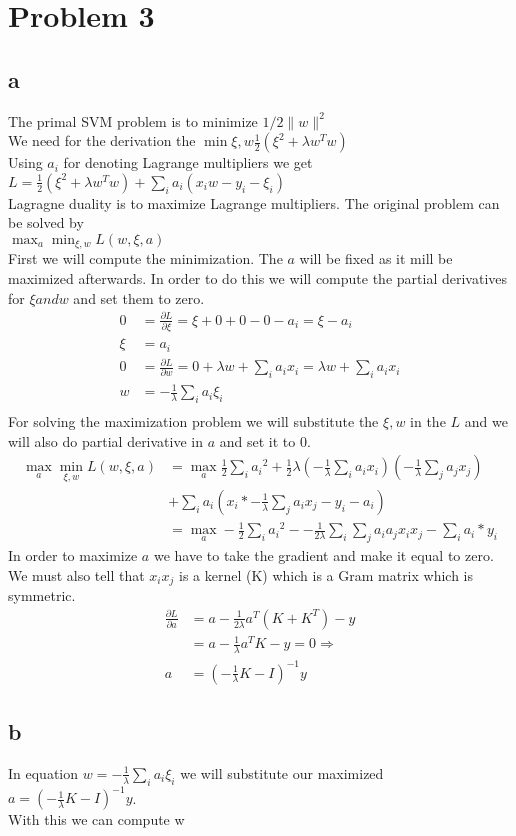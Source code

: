 \section{Problem 3}
\subsection{a}
The primal SVM problem is to minimize $1/2 \lVert{w}\rVert^2$\\
We need for the derivation the $\min\limits{\xi,w}\frac{1}{2} (\xi^2 + \lambda w^Tw)$ \\
Using $a_i$ for denoting Lagrange multipliers we get
$L = \frac{1}{2} (\xi^2 + \lambda w^Tw) + \sum_{i}{}a_i(x_iw -y_i-\xi_i)$\\
Lagragne duality is to maximize Lagrange multipliers. The original problem can be solved by \\
$\max_a\min_{\xi,w}L(w,\xi,a)$\\
First we will compute the minimization. The $a$ will be fixed as it mill be maximized afterwards.
In order to do this we will compute the partial derivatives for $\xi and w$ and set them to zero.
\begin{align*}
0 &= \frac{\partial L}{\partial \xi} = \xi + 0 + 0 - 0 - a_i = \xi - a_i\\
\xi &= a_i\\
0 &= \frac{\partial L}{\partial w} = 0 + \lambda w + \sum_{i}{}a_ix_i = \lambda w + \sum_{i}{}a_ix_i\\
w &= -\frac{1}{\lambda} \sum_{i}{}a_i\xi_i\\
\end{align*}
For solving the maximization problem we will substitute the $\xi,w$ in the $L$ and we will also do partial derivative in $a$
and set it to 0.\\
\begin{align*}
\max_a\min_{\xi,w}L(w,\xi,a) &= \max_a \frac{1}{2}\sum_i{a_i}^2 + \frac{1}{2}\lambda(-\frac{1}{\lambda}\sum_{i}{}a_ix_i) (-\frac{1}{\lambda}\sum_{j}{}a_jx_j) \\
&+ \sum_{i}{}a_i(x_i* -\frac{1}{\lambda}\sum_{j}{}a_ix_j-y_i-a_i)\\
&= \max_a-\frac{1}{2}\sum_i{a_i}^2 - -\frac{1}{2\lambda}\sum_i\sum_j a_i a_j x_i x_j - \sum_i a_i*y_i
\end{align*}
In order to maximize $a$ we have to take the gradient and make it equal to zero.
We must also tell that $x_i x_j$ is a kernel (K) which is a Gram matrix which is symmetric.
\begin{align*}
\frac{\partial L}{\partial a} &= a -\frac{1}{2\lambda}a^T(K+K^T) -y\\
&= a -\frac{1}{\lambda}a^T K -y = 0 \Rightarrow \\
a &= (-\frac{1}{\lambda}K-I)^{-1} y 
\end{align*}
\subsection{b}
In equation $w = -\frac{1}{\lambda} \sum_{i}{}a_i\xi_i$ we will substitute our maximized \\
$a = (-\frac{1}{\lambda}K-I)^{-1} y$.\\
With this we can compute w
